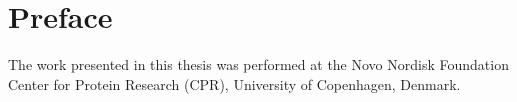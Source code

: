 \chapter*{Preface}

The work presented in this thesis was performed
at the Novo Nordisk Foundation Center for Protein Research (CPR),
University of Copenhagen, Denmark.
